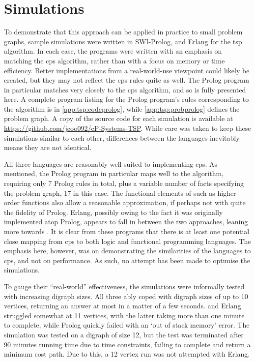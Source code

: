 \section{\label{sec:tsp:simulation}Simulations}
To demonstrate that this approach can be applied in practice to small problem graphs, sample simulations were written in SWI-Prolog, \fsharp{} and Erlang for the \gls{tsp} algorithm.  In each case, the programs were written with an emphasis on matching the \gls{cps} algorithm, rather than with a focus on memory or time efficiency.  Better implementations from a real-world-use viewpoint could likely be created, but they may not reflect the \gls{cps} rules quite as well.  The Prolog program in particular matches very closely to the \gls{cps} algorithm, and so is fully presented here.  A complete program listing for the Prolog program's rules corresponding to the algorithm is in \cref{app:tsp:codeprolog}, while \cref{app:tsp:probprolog} defines the problem graph.  A copy of the source code for each simulation is available at \url{https://github.com/jcoo092/cP-Systems-TSP}.  While care was taken to keep these simulations similar to each other, differences between the languages inevitably means they are not identical.

All three languages are reasonably well-suited to implementing \gls{cps}.  As mentioned, the Prolog program in particular maps well to the algorithm, requiring only 7 Prolog rules in total, plus a variable number of facts specifying the problem graph, 17 in this case.  The functional elements of \fsharp{} such as higher-order functions also allow a reasonable approximation, if perhaps not with quite the fidelity of Prolog.  Erlang, possibly owing to the fact it was originally implemented atop Prolog, appears to fall in between the two approaches, leaning more towards \fsharp{}.  It is clear from these programs that there is at least one potential close mapping from \gls{cps} to both logic and functional programming languages.  The emphasis here, however, was on demonstrating the similarities of the languages to \gls{cps}, and not on performance.  As such, no attempt has been made to optimise the simulations.

To gauge their ``real-world'' effectiveness, the simulations were informally tested with increasing digraph sizes.  All three ably coped with digraph sizes of up to 10 vertices, returning an answer at most in a matter of a few seconds.  \fsharp{} and Erlang struggled somewhat at 11 vertices, with the latter taking more than one minute to complete, while Prolog quickly failed with an `out of stack memory' error.  The \fsharp{} simulation was tested on a digraph of size 12, but the test was terminated after 90 minutes running time due to time constraints, failing to complete and return a minimum cost path.  Due to this, a 12 vertex run was not attempted with Erlang.

